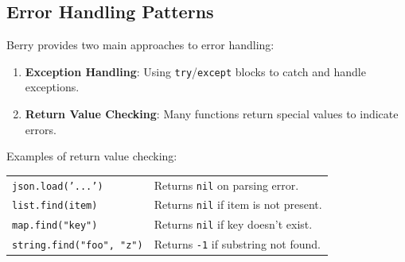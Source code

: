\subsection*{Error Handling Patterns}
Berry provides two main approaches to error handling:
\begin{enumerate}
    \item \textbf{Exception Handling}: Using \texttt{try}/\texttt{except} blocks to catch and handle exceptions.
    \item \textbf{Return Value Checking}: Many functions return special values to indicate errors.
\end{enumerate}

\hangpar Examples of return value checking:\\
\begin{tabular}{@{}lp{}}
\texttt{json.load('...')} & Returns \texttt{nil} on parsing error. \\
\texttt{list.find(item)} & Returns \texttt{nil} if item is not present. \\
\texttt{map.find("key")} & Returns \texttt{nil} if key doesn't exist. \\
\texttt{string.find("foo", "z")} & Returns \texttt{-1} if substring not found. \\
\end{tabular}
